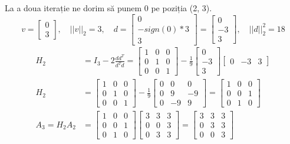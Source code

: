 \documentclass{exam}
\begin{document}
La a doua iterație ne dorim să punem 0 pe poziția (2, 3).
\begin{equation*}
	v = \begin{bmatrix} 0 \\ 3 \end{bmatrix}, \quad ||v||_2 = 3, \quad d = \begin{bmatrix} 0 \\ -sign(0) * 3 \\ 3 \end{bmatrix} = \begin{bmatrix} 0 \\ -3 \\ 3 \end{bmatrix}, \quad ||d||_2^2 = 18
\end{equation*}
\begin{align*}
	H_2           & = I_3 - 2 \frac{d d^T}{d^T d} = \begin{bmatrix} 1 & 0 & 0 \\ 0 & 1 & 0 \\ 0 & 0 & 1 \end{bmatrix} - \frac{1}{9} \begin{bmatrix} 0 \\ -3 \\ 3 \end{bmatrix} \begin{bmatrix} 0 & -3 & 3 \end{bmatrix}                       \\
	H_2           & = \begin{bmatrix} 1 & 0 & 0 \\ 0 & 1 & 0 \\ 0 & 0 & 1 \end{bmatrix} - \frac{1}{9} \begin{bmatrix} 0 & 0 & 0 \\ 0 & 9 & -9 \\ 0 & -9 & 9 \end{bmatrix} = \begin{bmatrix} 1 & 0 & 0 \\ 0 & 0 & 1 \\ 0 & 1 & 0 \end{bmatrix} \\
	A_3 = H_2 A_2 & = \begin{bmatrix} 1 & 0 & 0 \\ 0 & 0 & 1 \\ 0 & 1 & 0 \end{bmatrix} \begin{bmatrix} 3 & 3 & 3 \\ 0 & 0 & 3 \\ 0 & 3 & 3 \end{bmatrix} = \begin{bmatrix} 3 & 3 & 3 \\ 0 & 3 & 3 \\ 0 & 0 & 3 \end{bmatrix}
\end{align*}
\end{document}
